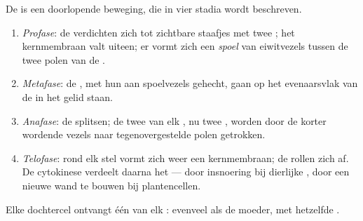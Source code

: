 \begin{proposition}\label{prop:g11:cell-cycle-mitosis:stages}
De  is een doorlopende beweging, die in vier stadia wordt
beschreven.
\begin{enumerate}
  \item \emph{Profase}: de  verdichten zich tot zichtbare
        staafjes met twee ; het kernmembraan valt uiteen; er
        vormt zich een \emph{spoel} van eiwitvezels tussen de twee polen
        van de .
  \item \emph{Metafase}: de , met hun  aan
        spoelvezels gehecht, gaan op het evenaarsvlak van de  in het
        gelid staan.
  \item \emph{Anafase}: de  splitsen; de twee  van
        elk , nu twee , worden door de korter
        wordende vezels naar tegenovergestelde polen getrokken.
  \item \emph{Telofase}: rond elk stel vormt zich weer een kernmembraan;
        de  rollen zich af. De cytokinese verdeelt daarna het
         --- door insnoering bij dierlijke , door een
        nieuwe wand te bouwen bij plantencellen.
\end{enumerate}
Elke dochtercel ontvangt één  van elk : evenveel
 als de moeder, met hetzelfde .
\end{proposition}
\admitted

